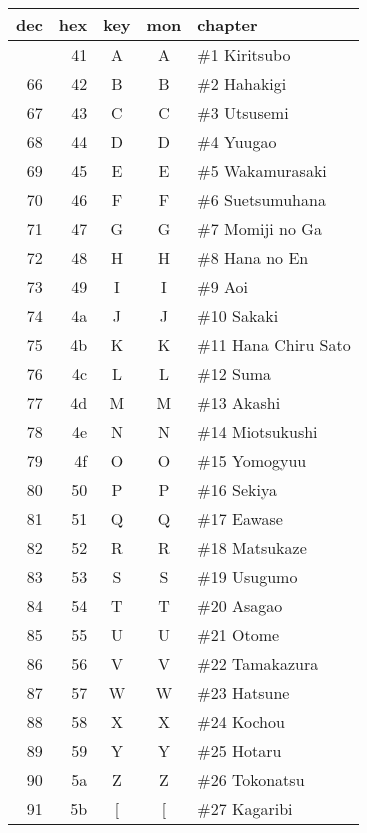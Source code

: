 \documentclass[12pt]{article}
\newcommand\genji[1]{{\genjiface #1}}
\begin{document}
\begin{tabular}{rrccl}
 dec & hex & key & mon & chapter \\ \hline \bigstrut[t]
  65 & 41 & A & \genji{\large A} & \#1 Kiritsubo \\
  66 & 42 & B & \genji{\large B} & \#2 Hahakigi \\
  67 & 43 & C & \genji{\large C} & \#3 Utsusemi \\
  68 & 44 & D & \genji{\large D} & \#4 Yuugao \\
  69 & 45 & E & \genji{\large E} & \#5 Wakamurasaki \\
  70 & 46 & F & \genji{\large F} & \#6 Suetsumuhana \\
  71 & 47 & G & \genji{\large G} & \#7 Momiji no Ga \\
  72 & 48 & H & \genji{\large H} & \#8 Hana no En \\
  73 & 49 & I & \genji{\large I} & \#9 Aoi \\
  74 & 4a & J & \genji{\large J} & \#10 Sakaki \\
  75 & 4b & K & \genji{\large K} & \#11 Hana Chiru Sato \\
  76 & 4c & L & \genji{\large L} & \#12 Suma \\
  77 & 4d & M & \genji{\large M} & \#13 Akashi \\
  78 & 4e & N & \genji{\large N} & \#14 Miotsukushi \\
  79 & 4f & O & \genji{\large O} & \#15 Yomogyuu \\
  80 & 50 & P & \genji{\large P} & \#16 Sekiya \\
  81 & 51 & Q & \genji{\large Q} & \#17 Eawase \\
  82 & 52 & R & \genji{\large R} & \#18 Matsukaze \\
  83 & 53 & S & \genji{\large S} & \#19 Usugumo \\
  84 & 54 & T & \genji{\large T} & \#20 Asagao \\
  85 & 55 & U & \genji{\large U} & \#21 Otome \\
  86 & 56 & V & \genji{\large V} & \#22 Tamakazura \\
  87 & 57 & W & \genji{\large W} & \#23 Hatsune \\
  88 & 58 & X & \genji{\large X} & \#24 Kochou \\
  89 & 59 & Y & \genji{\large Y} & \#25 Hotaru \\
  90 & 5a & Z & \genji{\large Z} & \#26 Tokonatsu \\
  91 & 5b & [ & \genji{\large [} & \#27 Kagaribi \\
\end{tabular}
\end{document}
